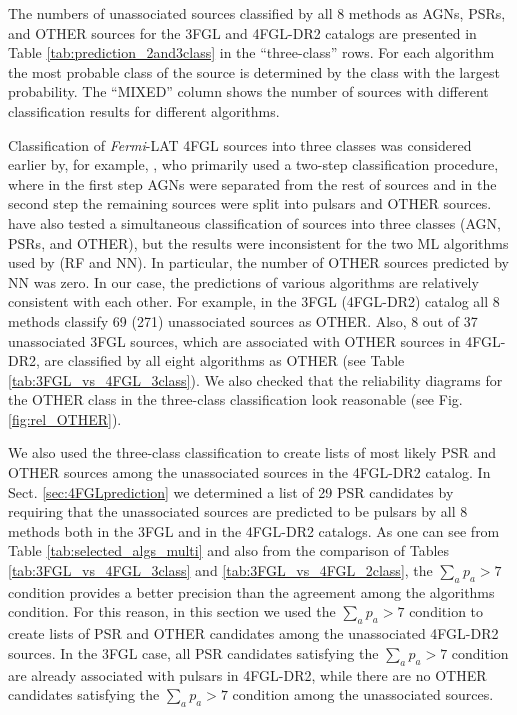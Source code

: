 \documentclass[referee]{aa} %
\newcommand{\Fermi}{\textit{Fermi}\xspace}
\begin{document}
The numbers of unassociated sources classified by all 8 methods as AGNs, PSRs, and OTHER sources for the 3FGL and 4FGL-DR2 catalogs are presented in Table \ref{tab:prediction_2and3class} in the ``three-class'' rows.
For each algorithm the most probable class of the source is determined by the class with the largest probability.
The ``MIXED'' column shows the number of sources with different classification results for different algorithms.

Classification of \Fermi-LAT 4FGL sources into three classes was considered earlier by, for example, \cite{2021RAA....21...15Z}, 
who primarily used a two-step classification procedure, where in the first step AGNs were separated from the rest of sources and in the second step the remaining sources were split into pulsars and OTHER sources.
\cite{2021RAA....21...15Z} have also tested a simultaneous classification of sources into three classes (AGN, PSRs, and OTHER),
but the results were inconsistent for the two ML algorithms used by \cite{2021RAA....21...15Z} (RF and NN).
In particular, the number of OTHER sources predicted by NN was zero.
In our case, the predictions of various algorithms are relatively consistent with each other.
For example, in the 3FGL (4FGL-DR2) catalog all 8 methods classify 69 (271) unassociated sources as OTHER.
Also, 8 out of 37 unassociated 3FGL sources, which are associated with OTHER sources in 4FGL-DR2, are classified by all eight algorithms as
OTHER (see Table \ref{tab:3FGL_vs_4FGL_3class}).
We also checked that the reliability diagrams for the OTHER class in the three-class classification look reasonable
(see Fig. \ref{fig:rel_OTHER}).

We also used the three-class classification to create lists of most likely PSR and OTHER sources among the unassociated
sources in the 4FGL-DR2 catalog.
In Sect. \ref{sec:4FGLprediction} we determined a list of 29 PSR candidates by requiring that 
the unassociated sources are predicted to be pulsars by all 8 methods both in the 3FGL and in the 4FGL-DR2 catalogs.
As one can see from Table \ref{tab:selected_algs_multi} and also from the comparison of Tables \ref{tab:3FGL_vs_4FGL_3class}
and \ref{tab:3FGL_vs_4FGL_2class}, the $\sum_a p_a > 7$ condition provides a better precision than the 
agreement among the algorithms condition.
For this reason, in this section we used the $\sum_a p_a > 7$ condition to create lists of PSR and OTHER candidates
among the unassociated 4FGL-DR2 sources.
In the 3FGL case, all PSR candidates satisfying the $\sum_a p_a > 7$ condition are already associated with pulsars in 4FGL-DR2,
while there are no OTHER candidates satisfying the $\sum_a p_a > 7$ condition among the unassociated sources. 
\end{document}
